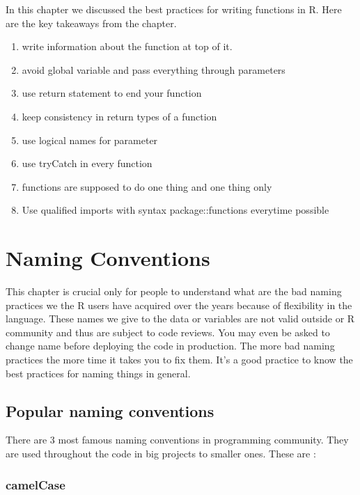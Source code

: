 \documentclass[
]{book}
\providecommand{\tightlist}{%
  \setlength{\itemsep}{0pt}\setlength{\parskip}{0pt}}
\begin{document}
In this chapter we discussed the best practices for writing functions in R. Here are the key takeaways from the chapter.

\begin{enumerate}
\def\labelenumi{\arabic{enumi}.}
\tightlist
\item
  write information about the function at top of it.
\item
  avoid global variable and pass everything through parameters
\item
  use return statement to end your function
\item
  keep consistency in return types of a function
\item
  use logical names for parameter
\item
  use tryCatch in every function
\item
  functions are supposed to do one thing and one thing only
\item
  Use qualified imports with syntax package::functions everytime possible
\end{enumerate}

\hypertarget{names}{%
\chapter{Naming Conventions}\label{names}}

This chapter is crucial only for people to understand what are the bad naming practices we the R users have acquired over the years because of flexibility in the language. These names we give to the data or variables are not valid outside or R community and thus are subject to code reviews. You may even be asked to change name before deploying the code in production. The more bad naming practices the more time it takes you to fix them. It's a good practice to know the best practices for naming things in general.

\hypertarget{popular-naming-conventions}{%
\section{Popular naming conventions}\label{popular-naming-conventions}}

There are 3 most famous naming conventions in programming community. They are used throughout the code in big projects to smaller ones. These are :

\hypertarget{camelcase}{%
\subsection{camelCase}\label{camelcase}}
\end{document}
